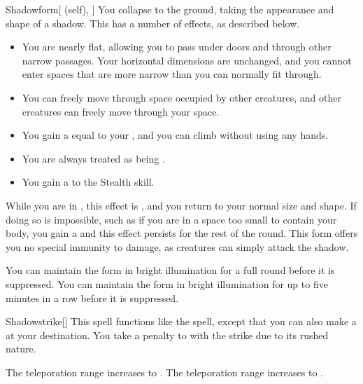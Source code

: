 \lowercase{\hypertarget{spell:Shadowform}{}}\label{spell:Shadowform}
\begin{attuneability}[Rank 4]{\hypertarget{spell:Shadowform}{Shadowform}}[ (self), ]
You collapse to the ground, taking the appearance and shape of a shadow.
This has a number of effects, as described below.
\begin{itemize}
\item You are nearly flat, allowing you to pass under doors and through other narrow passages.
Your horizontal dimensions are unchanged, and you cannot enter spaces that are more narrow than you can normally fit through.
\item You can freely move through space occupied by other creatures, and other creatures can freely move through your space.
\item You gain a  equal to your , and you can climb without using any hands.
\item You are always treated as being .
\item You gain a   to the Stealth skill.
\end{itemize}

While you are in , this effect is , and you return to your normal size and shape.
If doing so is impossible, such as if you are in a space too small to contain your body, you gain a  and this effect persists for the rest of the round.
This form offers you no special immunity to damage, as creatures can simply attack the shadow.

\rankline
{} You can maintain the form in bright illumination for a full round before it is suppressed.
 You can maintain the form in bright illumination for up to five minutes in a row before it is suppressed.
\end{attuneability}
\vspace{0.25em}



\lowercase{\hypertarget{spell:Shadowstrike}{}}\label{spell:Shadowstrike}
\begin{freeability}[Rank 4]{\hypertarget{spell:Shadowstrike}{Shadowstrike}}[]
This spell functions like the  spell, except that you can also make a  at your destination.
You take a  penalty to  with the strike due to its rushed nature.

\rankline
{} The teleporation range increases to \rnglong.
 The teleporation range increases to \rngext.
\end{freeability}
\vspace{0.25em}




